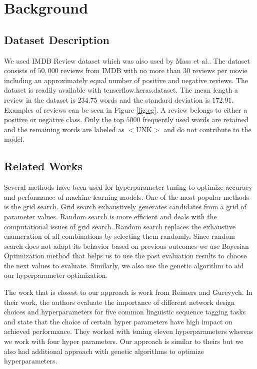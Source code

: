 \documentclass[conference]{IEEEtran}
\begin{document}
\section{Background}
\subsection{Dataset Description}
We used IMDB Review dataset which was also used by Mass et al.\cite{imdb}. The dataset consists of $50,000$ reviews from IMDB with no more than $30$ reviews per movie including an approximately equal number of positive and negative reviews. The dataset is readily available with tenserflow.keras.dataset. The mean length a review in the dataset is $234.75$ words and the standard deviation is $172.91$. Examples of reviews can be seen in Figure \ref{fig:eg}. A review belongs to either a positive or negative class. Only the top $5000$ frequently used words are retained and the remaining words are labeled as $<$UNK$>$ and do not contribute to the model.

\subsection{Related Works}
Several methods have been used for hyperparameter tuning to optimize accuracy and performance\cite{methods} of machine learning models. One of the most popular methods is the grid search. Grid search exhaustively generates candidates from a grid of parameter values. Random search \cite {random,odyssey} is more efficient and deals with the computational issues of grid search. Random search replaces the exhaustive enumeration of all combinations by selecting them randomly. Since random search does not adapt its behavior based on previous outcomes we use Bayesian Optimization\cite{bayesian} method that helps us to use the past evaluation results to choose the next values to evaluate. Similarly, we also use the genetic algorithm to aid our hyperparameter optimization.

The work that is closest to our approach is work from Reimers and Gurevych\cite{optimal}. In their work, the authors evaluate the importance of different network design choices and hyperparameters for five common linguistic sequence tagging tasks and state that the choice of certain hyper parameters have high impact on achieved performance. They worked with tuning eleven hyperparameters whereas we work with four hyper parameters. Our approach is similar to theirs but we also had additional approach with genetic algorithms to optimize hyperparameters.
\end{document}
